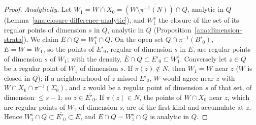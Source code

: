 \begin{proof}
\emph{Analyticity.} Let \(W_1=\overline{W\cap X_0}=\overline{(W\setminus\pi^{-1}(N))\cap Q}\), analytic in \(Q\) (Lemma~\ref{ana:closure-difference-analytic}),
and \(W_1^s\) the closure of the set of its regular points of dimension \(s\) in \(Q\), analytic in \(Q\) (Proposition~\ref{ana:dimension-strata}). We claim
\(\overline E\cap Q=W_1^s\cap Q\). On the open set \(Q\cap\pi^{-1}(B'_0)\), \(E=W=W_1\), so the points of \(E'_0\), regular of dimension \(s\) in \(E\), are regular
points of dimension \(s\) of \(W_1\); with the density, \(\overline E\cap Q\subset\overline{E'_0}\subset W_1^s\). Conversely let \(z\in Q\) be a regular point of
\(W_1\) of dimension \(s\). If \(\pi(z)\notin N\), then \(W_1=W\) near \(z\) (\(W\) is closed in \(Q\)); if a neighbourhood of \(z\) missed \(E'_0\), \(W\) would
agree near \(z\) with \(W\cap X_0\cap\pi^{-1}(\Sigma_0)\), and \(z\) would be a regular point of dimension \(s\) of that set, of dimension \(\le s-1\); so
\(z\in\overline{E'_0}\). If \(\pi(z)\in N\), the points of \(W\cap X_0\) near \(z\), which are regular points of \(W_1\) of dimension \(s\), are of the first kind
and accumulate at \(z\). Hence \(W_1^s\cap Q\subset\overline{E'_0}\subset\overline E\), and \(\overline E\cap Q=W_1^s\cap Q\) is analytic in \(Q\).
\end{proof}

